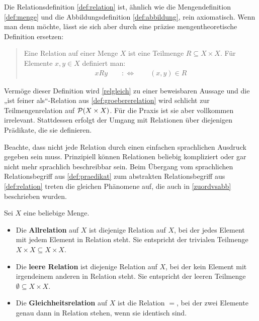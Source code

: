 \begin{vorschau}
    Die Relationsdefinition \cref{def:relation} ist, ähnlich wie die Mengendefinition \cref{def:menge} und die Abbildungsdefinition \cref{def:abbildung}, rein axiomatisch. Wenn man denn möchte, lässt sie sich aber durch eine präzise mengentheoretische Definition ersetzen:
    \begin{quote}
        Eine Relation auf einer Menge $X$ ist eine Teilmenge $R\subseteq X\times X$. Für Elemente $x,y\in X$ definiert man:
        \begin{align*}
            xRy\qquad:\Leftrightarrow\qquad (x,y) \in R
        \end{align*}
    \end{quote}
    Vermöge dieser Definition wird \cref{relgleich} zu einer beweisbaren Aussage und die „ist feiner als“-Relation aus \cref{def:groebererelation} wird schlicht zur Teilmengenrelation auf $\mathcal P(X\times X)$. Für die Praxis ist sie aber vollkommen irrelevant. Stattdessen erfolgt der Umgang mit Relationen über diejenigen Prädikate, die sie definieren.
    
    Beachte, dass nicht jede Relation durch einen einfachen sprachlichen Ausdruck gegeben sein muss. Prinzipiell können Relationen beliebig kompliziert oder gar nicht mehr sprachlich beschreibbar sein. Beim Übergang vom sprachlichen Relationsbegriff aus \cref{def:praedikat} zum abstrakten Relationsbegriff aus \cref{def:relation} treten die gleichen Phänomene auf, die auch in \cref{zuordvsabb} beschrieben wurden.
\end{vorschau}


\begin{bsp} \label{def:universellerelationen}  
    Sei $X$ eine beliebige Menge.
    \begin{itemize}
        \item Die \textbf{Allrelation} auf $X$ ist diejenige Relation auf $X$, bei der jedes Element mit jedem Element in Relation steht. Sie entspricht der trivialen Teilmenge $X\times X\subseteq X\times X$.
        \item Die \textbf{leere Relation} ist diejenige Relation auf $X$, bei der kein Element mit irgendeinem anderen in Relation steht. Sie entspricht der leeren Teilmenge $\emptyset\subseteq X\times X$.
        \item Die \textbf{Gleichheitsrelation} auf $X$ ist die Relation $=$, bei der zwei Elemente genau dann in Relation stehen, wenn sie identisch sind.
    \end{itemize}
\end{bsp}


